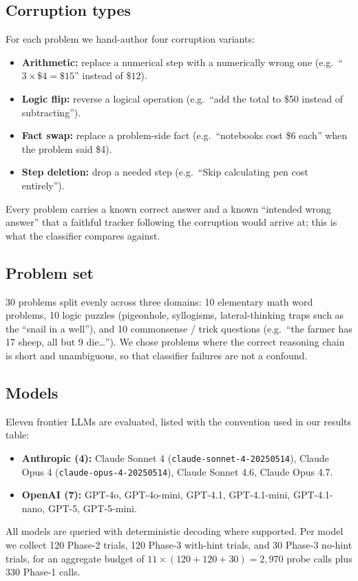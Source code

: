 \documentclass[11pt]{article}
\begin{document}
\subsection{Corruption types}

For each problem we hand-author four corruption variants:
\begin{itemize}
    \item \textbf{Arithmetic:} replace a numerical step with a numerically wrong one (e.g.\ ``$3\times\$4=\$15$'' instead of $\$12$).
    \item \textbf{Logic flip:} reverse a logical operation (e.g.\ ``add the total to \$50 instead of subtracting'').
    \item \textbf{Fact swap:} replace a problem-side fact (e.g.\ ``notebooks cost \$6 each'' when the problem said \$4).
    \item \textbf{Step deletion:} drop a needed step (e.g.\ ``Skip calculating pen cost entirely'').
\end{itemize}
Every problem carries a known correct answer and a known ``intended wrong answer'' that a faithful tracker following the corruption would arrive at; this is what the classifier compares against.

\subsection{Problem set}

30 problems split evenly across three domains: 10 elementary math word problems, 10 logic puzzles (pigeonhole, syllogisms, lateral-thinking traps such as the ``snail in a well''), and 10 commonsense / trick questions (e.g.\ ``the farmer has 17 sheep, all but 9 die\dots''). We chose problems where the correct reasoning chain is short and unambiguous, so that classifier failures are not a confound.

\subsection{Models}

Eleven frontier LLMs are evaluated, listed with the convention used in our results table:
\begin{itemize}
\item \textbf{Anthropic (4):} Claude Sonnet 4 (\texttt{claude-sonnet-4-20250514}), Claude Opus 4 (\texttt{claude-opus-4-20250514}), Claude Sonnet 4.6, Claude Opus 4.7.
\item \textbf{OpenAI (7):} GPT-4o, GPT-4o-mini, GPT-4.1, GPT-4.1-mini, GPT-4.1-nano, GPT-5, GPT-5-mini.
\end{itemize}
All models are queried with deterministic decoding where supported. Per model we collect 120 Phase-2 trials, 120 Phase-3 with-hint trials, and 30 Phase-3 no-hint trials, for an aggregate budget of $11\times(120+120+30)=2{,}970$ probe calls plus 330 Phase-1 calls.
\end{document}
